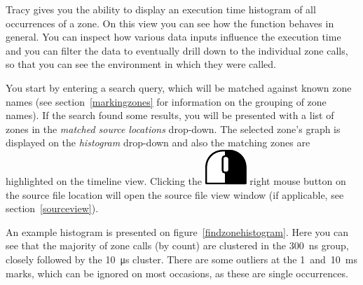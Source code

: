 \documentclass[hidelinks,titlepage,a4paper]{article}
\newcommand{\RMB}{\includegraphics[height=.8\baselineskip]{icons/rmb}}
\begin{document}
Tracy gives you the ability to display an execution time histogram of all occurrences of a zone. On this view you can see how the function behaves in general. You can inspect how various data inputs influence the execution time and you can filter the data to eventually drill down to the individual zone calls, so that you can see the environment in which they were called.

You start by entering a search query, which will be matched against known zone names (see section~\ref{markingzones} for information on the grouping of zone names). If the search found some results, you will be presented with a list of zones in the \emph{matched source locations} drop-down. The selected zone's graph is displayed on the \emph{histogram} drop-down and also the matching zones are highlighted on the timeline view. Clicking the \RMB{} right mouse button on the source file location will open the source file view window (if applicable, see section~\ref{sourceview}).

An example histogram is presented on figure~\ref{findzonehistogram}. Here you can see that the majority of zone calls (by count) are clustered in the 300~\si{\nano\second} group, closely followed by the 10~\si{\micro\second} cluster. There are some outliers at the 1~and~10~\si{\milli\second} marks, which can be ignored on most occasions, as these are single occurrences.
\end{document}
